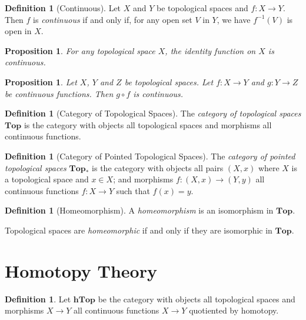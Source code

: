 \documentclass{book}
\newtheorem{proposition}[lemma]{Proposition}
\theoremstyle{definition}
\newtheorem{definition}[lemma]{Definition}
\newcommand{\inv}[1]{\ensuremath{{#1}^{-1}}}
\begin{document}
\begin{definition}[Continuous]
    Let $X$ and $Y$ be topological spaces and $f : X \rightarrow Y$. Then $f$ is \emph{continuous} if and only if, for any open set $V$
    in $Y$, we have $\inv{f}(V)$ is open in $X$.
\end{definition}

\begin{proposition}
    For any topological space $X$, the identity function on $X$ is continuous.
\end{proposition}

\begin{proposition}
    Let $X$, $Y$ and $Z$ be topological spaces. Let $f : X \rightarrow Y$ and $g : Y \rightarrow Z$ be continuous functions.
    Then $g \circ f$ is continuous.
\end{proposition}

\begin{definition}[Category of Topological Spaces]
    The \emph{category of topological spaces} $\mathbf{Top}$ is the category with objects all topological spaces and morphisms all
    continuous functions.
\end{definition}

\begin{definition}[Category of Pointed Topological Spaces]
    The \emph{category of pointed topological spaces} $\mathbf{Top}_*$ is the category with objects all pairs
    $(X,x)$ where $X$ is a topological space and $x \in X$; and morphisms $f : (X,x) \rightarrow (Y,y)$ all
    continuous functions $f : X \rightarrow Y$ such that $f(x) = y$.
\end{definition}

\begin{definition}[Homeomorphism]
    A \emph{homeomorphism} is an isomorphism in $\mathbf{Top}$.

    Topological spaces are \emph{homeomorphic} if and only if they are isomorphic in $\mathbf{Top}$.
\end{definition}

\section{Homotopy Theory}

\begin{definition}
    Let $\mathbf{hTop}$ be the category with objects all topological spaces and morphisms $X \rightarrow Y$
    all continuous functions $X \rightarrow Y$ quotiented by homotopy.
\end{definition}
\end{document}
